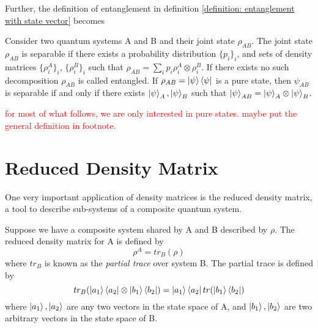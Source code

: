 




\bigskip
Further, the definition of entanglement in definition \ref{definition: entanglement with state vector} becomes 
\begin{definition}[Entanglement] \label{def: entanglement with density matrix}
 Consider two quantum systems A and B and their joint state $\rho_{AB}$. The joint state $\rho_{AB}$ is separable if there exists a probability distribution $\{p_i\}_i$, and sets of density matrices $\{\rho_i^A\}_i$, $\{\rho_i^B\}_i$ such that $\rho_{AB}=\sum_i p_i\rho_i^A\otimes\rho_i^B$.
 If there exists no such decomposition $\rho_{AB}$ is called entangled.
 If $\rho_{AB}=\ket{\psi}\bra{\psi}$ is a pure state, then $\psi_{AB}$ is separable if and only if there exists $\ket{\psi}_A, \ket{\psi}_B$ such that $\ket{\psi}_{AB}=\ket{\psi}_A \otimes \ket{\psi}_B$.
\end{definition}

\textcolor{red}{for most of what follows, we are only interested in pure states. maybe put the general definition in footnote.}

\section{Reduced Density Matrix}
One very important application of density matrices is the reduced density matrix, a tool to describe sub-systems of a composite quantum system.
\begin{definition}
 Suppose we have a composite system shared by A and B described by $\rho$. The reduced density matrix for A is defined by
\begin{equation}
    \rho^A=tr_B (\rho)
\end{equation}
where $tr_B$ is known as the \textit{partial trace} over system B. The partial trace is defined by
\begin{equation}
tr_B(\ket{a_1}\bra{a_2} \otimes \ket{b_1} \bra{b_2})=\ket{a_1}\bra{a_2}tr(\ket{b_1}\bra{b_2})
\end{equation}
where $\ket{a_1}, \ket{a_2}$ are any two vectors in the state space of A, and $\ket{b_1}, \ket{b_2}$ are two arbitrary vectors in the state space of B.
\end{definition}

